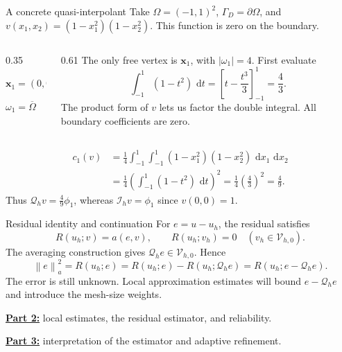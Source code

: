 \documentclass[11pt,aspectratio=169]{beamer}
\newcommand{\dd}{\,\mathrm{d}}
\newcommand{\Om}{\Omega}
\newcommand{\GamD}{\Gamma_D}
\newcommand{\Vhzero}{\mathcal V_{h,0}}
\newcommand{\Qh}{\mathcal Q_h}
\newcommand{\Ih}{\mathcal I_h}
\newcommand{\norm}[2][]{\left\lVert#2\right\rVert_{#1}}
\newcommand{\bx}{\bm x}
\begin{document}
\begin{frame}{A concrete quasi-interpolant}
Take $\Om=(-1,1)^2$, $\GamD=\partial\Om$, and
$v(x_1,x_2)=(1-x_1^2)(1-x_2^2)$. This function is zero on the boundary.

\begin{columns}[c,onlytextwidth]
\begin{column}{0.35\textwidth}
\centering
{}

$\bx_1=(0,0)$

$\omega_1=\overline\Om$
\end{column}
\begin{column}{0.61\textwidth}
The only free vertex is $\bx_1$, with $|\omega_1|=4$. First evaluate
\[
 \int_{-1}^1(1-t^2)\,\dd t
 =\left[t-\frac{t^3}{3}\right]_{-1}^1=\frac43.
\]
The product form of $v$ lets us factor the double integral.
All boundary coefficients are zero.
\end{column}
\end{columns}
\[
\begin{aligned}
 c_1(v)&=\frac14\int_{-1}^{1}\int_{-1}^{1}
 (1-x_1^2)(1-x_2^2)\,\dd x_1\,\dd x_2\\
 &=\frac14\left(\int_{-1}^1(1-t^2)\,\dd t\right)^2
 =\frac14\left(\frac43\right)^2=\frac49.
\end{aligned}
\]
Thus $\Qh v=\frac49\phi_1$, whereas $\Ih v=\phi_1$ since $v(0,0)=1$.
\end{frame}

\begin{frame}{Residual identity and continuation}
For $e=u-u_h$, the residual satisfies
\[
 R(u_h;v)=a(e,v),\qquad R(u_h;v_h)=0
 \quad(v_h\in\Vhzero).
\]
The averaging construction gives $\Qh e\in\Vhzero$. Hence
\[
 \norm[a]{e}^2=R(u_h;e)
 =R(u_h;e)-R(u_h;\Qh e)=R(u_h;e-\Qh e).
\]
The error is still unknown. Local approximation estimates will bound
$e-\Qh e$ and introduce the mesh-size weights.

\vspace{0.25cm}
\href{chapter08_estimator_independent_study.pdf}{\textbf{Part 2:}}
local estimates, the residual estimator, and reliability.

\href{chapter08_adaptivity_independent_study.pdf}{\textbf{Part 3:}}
interpretation of the estimator and adaptive refinement.
\end{frame}
\end{document}
